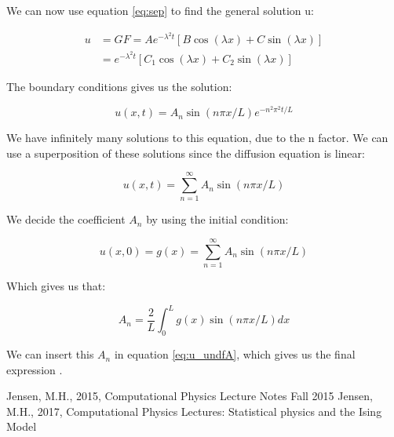 \documentclass{article}
\begin{document}
We can now use equation \ref{eq:sep} to find the general solution u:

\begin{equation}
\begin{split}
u &= GF = Ae^{-\lambda^2 t} [B\cos{(\lambda x)} + C\sin{(\lambda x)}]\\
&=e^{-\lambda^2 t} [C_1\cos{(\lambda x)} + C_2\sin{(\lambda x)}]
\end{split}
\end{equation}

The boundary conditions gives us the solution:

\begin{equation}
u(x,t) = A_n\sin{(n\pi x/L)}e^{-n^2\pi^2t/L}
\end{equation}

We have infinitely many solutions to this equation, due to the n factor. We can use a superposition of these solutions since the diffusion equation is linear:

\begin{equation}
u(x,t) = \sum_{n=1}^{\infty}A_n\sin{(n\pi x/L)}
\label{eq:u_undfA}
\end{equation}

We decide the coefficient $A_n$ by using the initial condition:

\begin{equation}
u(x,0)=g(x)=\sum_{n=1}^{\infty}A_n\sin{(n\pi x/L)}
\end{equation}

Which gives us that:

\begin{equation}
A_n=\frac{2}{L}\int_0^Lg(x)\sin{(n\pi x/L)} dx
\end{equation}

We can insert this $A_n$ in equation \ref{eq:u_undfA}, which gives us the final expression \cite{94}.


\begin{thebibliography}{9}
	Jensen, M.H., 2015, Computational Physics Lecture Notes Fall 2015
	Jensen, M.H., 2017, Computational Physics Lectures: Statistical physics and the Ising Model
\end{thebibliography}
\end{document}
